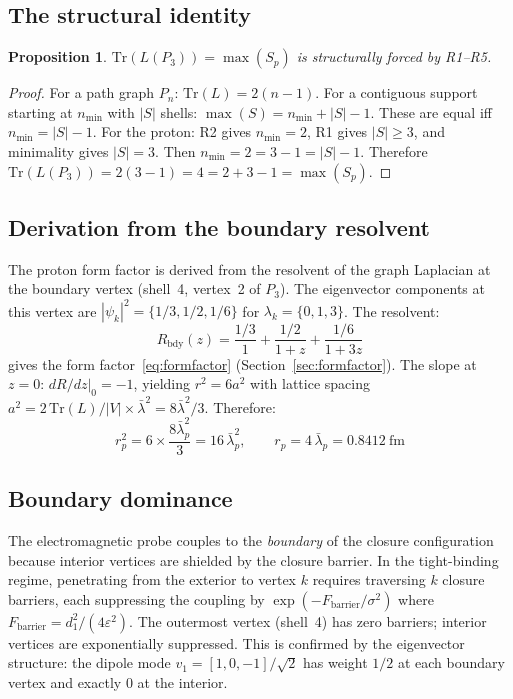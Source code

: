 \documentclass[12pt]{article}
\newtheorem{proposition}[theorem]{Proposition}
\newcommand{\lbar}{\bar{\lambda}}
\begin{document}
\subsection{The structural identity}

\begin{proposition}\label{prop:identity}
$\mathrm{Tr}(L(P_3)) = \max(S_p)$ is structurally forced by R1--R5.
\end{proposition}

\begin{proof}
For a path graph $P_n$: $\mathrm{Tr}(L) = 2(n-1)$. For a contiguous support starting at $n_{\min}$ with $|S|$ shells: $\max(S) = n_{\min} + |S| - 1$. These are equal iff $n_{\min} = |S| - 1$. For the proton: R2 gives $n_{\min} = 2$, R1 gives $|S| \geq 3$, and minimality gives $|S| = 3$. Then $n_{\min} = 2 = 3 - 1 = |S| - 1$. Therefore $\mathrm{Tr}(L(P_3)) = 2(3-1) = 4 = 2 + 3 - 1 = \max(S_p)$.
\end{proof}

\subsection{Derivation from the boundary resolvent}\label{sec:resolvent}

The proton form factor is derived from the resolvent of the graph Laplacian at the boundary vertex (shell~4, vertex~2 of $P_3$). The eigenvector components at this vertex are $|\psi_k|^2 = \{1/3, 1/2, 1/6\}$ for $\lambda_k = \{0, 1, 3\}$. The resolvent:
\begin{equation}
    R_{\mathrm{bdy}}(z) = \frac{1/3}{1} + \frac{1/2}{1+z} + \frac{1/6}{1+3z}
\end{equation}
gives the form factor~\eqref{eq:formfactor} (Section~\ref{sec:formfactor}). The slope at $z = 0$: $dR/dz|_0 = -1$, yielding $r^2 = 6a^2$ with lattice spacing $a^2 = 2\,\mathrm{Tr}(L)/|V| \times \lbar^2 = 8\lbar^2/3$. Therefore:
\begin{equation}
    r_p^2 = 6 \times \frac{8\lbar_p^2}{3} = 16\,\lbar_p^2, \qquad r_p = 4\,\lbar_p = 0.8412~\text{fm}
\end{equation}

\subsection{Boundary dominance}\label{sec:boundary_dominance}

The electromagnetic probe couples to the \textit{boundary} of the closure configuration because interior vertices are shielded by the closure barrier. In the tight-binding regime, penetrating from the exterior to vertex $k$ requires traversing $k$ closure barriers, each suppressing the coupling by $\exp(-F_{\mathrm{barrier}}/\sigma^2)$ where $F_{\mathrm{barrier}} = d_1^2/(4\varepsilon^2)$. The outermost vertex (shell~4) has zero barriers; interior vertices are exponentially suppressed. This is confirmed by the eigenvector structure: the dipole mode $v_1 = [1, 0, -1]/\sqrt{2}$ has weight $1/2$ at each boundary vertex and exactly $0$ at the interior.
\end{document}
